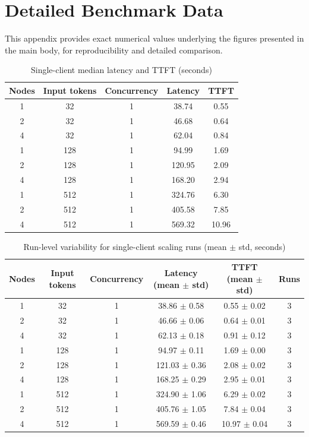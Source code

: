 \documentclass[conference]{IEEEtran}
\begin{document}
\clearpage
\appendices
\section{Detailed Benchmark Data}
\label{sec:appendix}

This appendix provides exact numerical values underlying the figures presented in the main body, for reproducibility and detailed comparison.

\begin{table}[ht]
\caption{Single-client median latency and TTFT (seconds)}
\label{tab:latency_c1}
\centering
\begin{tabular}{|c|c|c|c|c|}
\hline
Nodes & Input tokens & Concurrency & Latency & TTFT \\
\hline
1 & 32 & 1 & 38.74 & 0.55 \\
2 & 32 & 1 & 46.68 & 0.64 \\
4 & 32 & 1 & 62.04 & 0.84 \\
\hline
1 & 128 & 1 & 94.99 & 1.69 \\
2 & 128 & 1 & 120.95 & 2.09 \\
4 & 128 & 1 & 168.20 & 2.94 \\
\hline
1 & 512 & 1 & 324.76 & 6.30 \\
2 & 512 & 1 & 405.58 & 7.85 \\
4 & 512 & 1 & 569.32 & 10.96 \\
\hline
\end{tabular}
\end{table}

\begin{table}[ht]
\caption{Run-level variability for single-client scaling runs (mean $\pm$ std, seconds)}
\label{tab:raw_variability}
\centering
\begin{tabular}{|c|c|c|c|c|c|}
\hline
Nodes & Input tokens & Concurrency & Latency (mean $\pm$ std) & TTFT (mean $\pm$ std) & Runs \\
\hline
1 & 32 & 1 & 38.86 $\pm$ 0.58 & 0.55 $\pm$ 0.02 & 3 \\
2 & 32 & 1 & 46.66 $\pm$ 0.06 & 0.64 $\pm$ 0.01 & 3 \\
4 & 32 & 1 & 62.13 $\pm$ 0.18 & 0.91 $\pm$ 0.12 & 3 \\
1 & 128 & 1 & 94.97 $\pm$ 0.11 & 1.69 $\pm$ 0.00 & 3 \\
2 & 128 & 1 & 121.03 $\pm$ 0.36 & 2.08 $\pm$ 0.02 & 3 \\
4 & 128 & 1 & 168.25 $\pm$ 0.29 & 2.95 $\pm$ 0.01 & 3 \\
1 & 512 & 1 & 324.90 $\pm$ 1.06 & 6.29 $\pm$ 0.02 & 3 \\
2 & 512 & 1 & 405.76 $\pm$ 1.05 & 7.84 $\pm$ 0.04 & 3 \\
4 & 512 & 1 & 569.59 $\pm$ 0.46 & 10.97 $\pm$ 0.04 & 3 \\
\hline
\end{tabular}
\end{table}
\end{document}
